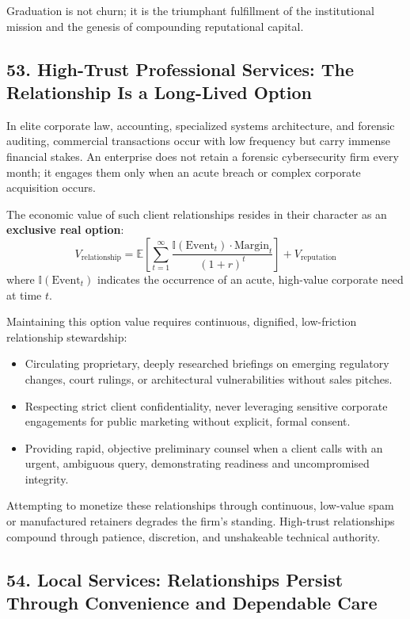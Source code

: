 Graduation is not churn; it is the triumphant fulfillment of the institutional mission and the genesis of compounding reputational capital.

\subsection*{53. High-Trust Professional Services: The Relationship Is a Long-Lived Option}

In elite corporate law, accounting, specialized systems architecture, and forensic auditing, commercial transactions occur with low frequency but carry immense financial stakes. An enterprise does not retain a forensic cybersecurity firm every month; it engages them only when an acute breach or complex corporate acquisition occurs.

The economic value of such client relationships resides in their character as an \textbf{exclusive real option}:
\begin{equation}
V_{\text{relationship}} = \mathbb{E}\left[\sum_{t=1}^{\infty} \frac{\mathbb{I}(\text{Event}_t) \cdot \text{Margin}_t}{(1 + r)^t}\right] + V_{\text{reputation}}
\end{equation}
where $\mathbb{I}(\text{Event}_t)$ indicates the occurrence of an acute, high-value corporate need at time $t$. 

Maintaining this option value requires continuous, dignified, low-friction relationship stewardship:
\begin{itemize}[leftmargin=*]
\item Circulating proprietary, deeply researched briefings on emerging regulatory changes, court rulings, or architectural vulnerabilities without sales pitches.
\item Respecting strict client confidentiality, never leveraging sensitive corporate engagements for public marketing without explicit, formal consent.
\item Providing rapid, objective preliminary counsel when a client calls with an urgent, ambiguous query, demonstrating readiness and uncompromised integrity.
\end{itemize}

Attempting to monetize these relationships through continuous, low-value spam or manufactured retainers degrades the firm's standing. High-trust relationships compound through patience, discretion, and unshakeable technical authority.

\subsection*{54. Local Services: Relationships Persist Through Convenience and Dependable Care}

